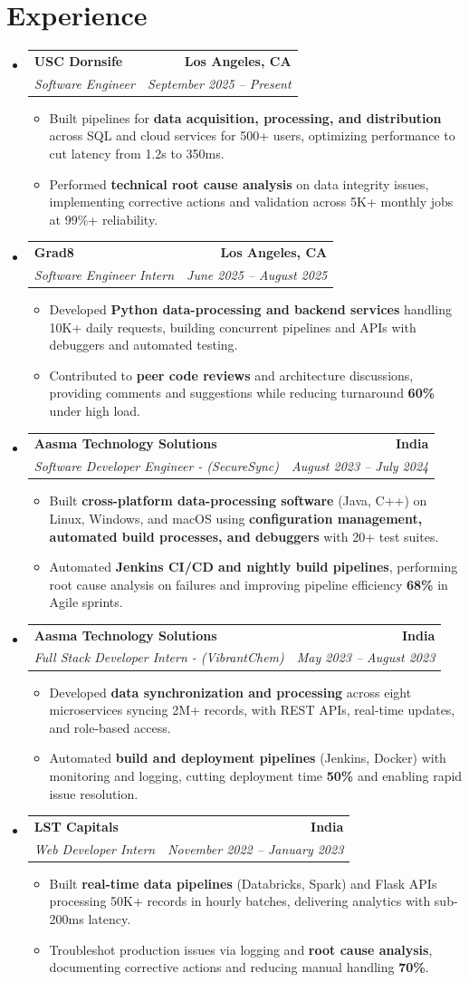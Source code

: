 \documentclass[letterpaper,10pt]{article}
\makeatletter
\newcommand{\resumeItem}[1]{\item\small{{#1 \vspace{-2pt}}}}
\newcommand{\resumeSubheading}[4]{\vspace{-1pt}\item\begin{tabular*}{1.0\textwidth}[t]{l@{\extracolsep{\fill}}r}\textbf{#1} & \textbf{\small #2} \\\textit{\small#3} & \textit{\small #4} \\\end{tabular*}\vspace{-2pt}}
\newcommand{\resumeSubHeadingListStart}{\begin{itemize}[leftmargin=0.0in, label={}]}
\newcommand{\resumeSubHeadingListEnd}{\end{itemize}}
\newcommand{\resumeItemListStart}{\begin{itemize}[leftmargin=0.15in,label=\textbullet,itemsep=2pt,topsep=0pt,parsep=0pt,partopsep=0pt]}
\newcommand{\resumeItemListEnd}{\end{itemize}\vspace{-4pt}}
\makeatother
\begin{document}
\section{Experience}
\resumeSubHeadingListStart
\resumeSubheading{USC Dornsife}{Los Angeles, CA}{Software Engineer}{September 2025 -- Present}
\resumeItemListStart
\resumeItem{Built pipelines for \textbf{data acquisition, processing, and distribution} across SQL and cloud services for 500+ users, optimizing performance to cut latency from 1.2s to 350ms.}
\resumeItem{Performed \textbf{technical root cause analysis} on data integrity issues, implementing corrective actions and validation across 5K+ monthly jobs at 99\%+ reliability.}
\resumeItemListEnd
\resumeSubheading{Grad8}{Los Angeles, CA}{Software Engineer Intern}{June 2025 -- August 2025}
\resumeItemListStart
\resumeItem{Developed \textbf{Python data-processing and backend services} handling 10K+ daily requests, building concurrent pipelines and APIs with debuggers and automated testing.}
\resumeItem{Contributed to \textbf{peer code reviews} and architecture discussions, providing comments and suggestions while reducing turnaround \textbf{60\%} under high load.}
\resumeItemListEnd
\resumeSubheading{Aasma Technology Solutions}{India}{Software Developer Engineer - (SecureSync)}{August 2023 -- July 2024}
\resumeItemListStart
\resumeItem{Built \textbf{cross-platform data-processing software} (Java, C++) on Linux, Windows, and macOS using \textbf{configuration management, automated build processes, and debuggers} with 20+ test suites.}
\resumeItem{Automated \textbf{Jenkins CI/CD and nightly build pipelines}, performing root cause analysis on failures and improving pipeline efficiency \textbf{68\%} in Agile sprints.}
\resumeItemListEnd
\resumeSubheading{Aasma Technology Solutions}{India}{Full Stack Developer Intern - (VibrantChem)}{May 2023 -- August 2023}
\resumeItemListStart
\resumeItem{Developed \textbf{data synchronization and processing} across eight microservices syncing 2M+ records, with REST APIs, real-time updates, and role-based access.}
\resumeItem{Automated \textbf{build and deployment pipelines} (Jenkins, Docker) with monitoring and logging, cutting deployment time \textbf{50\%} and enabling rapid issue resolution.}
\resumeItemListEnd
\resumeSubheading{LST Capitals}{India}{Web Developer Intern}{November 2022 -- January 2023}
\resumeItemListStart
\resumeItem{Built \textbf{real-time data pipelines} (Databricks, Spark) and Flask APIs processing 50K+ records in hourly batches, delivering analytics with sub-200ms latency.}
\resumeItem{Troubleshot production issues via logging and \textbf{root cause analysis}, documenting corrective actions and reducing manual handling \textbf{70\%}.}
\resumeItemListEnd
\resumeSubHeadingListEnd
\vspace{-6pt}
\end{document}

